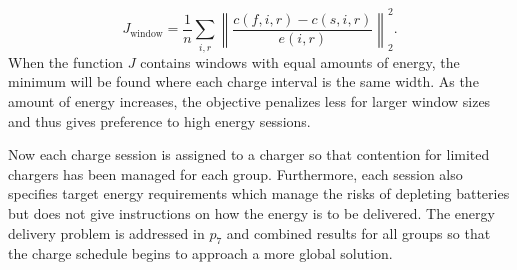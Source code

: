 \begin{equation}\label{eqn:optChargeSchedule:objective}
	J_{\text{window}} = \frac{1}{n}\sum_{i,r} \left \lVert \frac{c(f,i,r) - c(s,i,r)}{e(i,r)} \right \rVert^2_2.
\end{equation}
When the function $J$ contains windows with equal amounts of energy, the minimum will be found where each charge interval is the same width. As the amount of energy increases, the objective penalizes less for larger window sizes and thus gives preference to high energy sessions.
\par Now each charge session is assigned to a charger so that contention for limited chargers has been managed for each group. Furthermore, each session also specifies target energy requirements which manage the risks of depleting batteries but does not give instructions on how the energy is to be delivered. The energy delivery problem is addressed in $p_7$ and combined results for all groups so that the charge schedule begins to approach a more global solution.  
\\[0.1in]  


